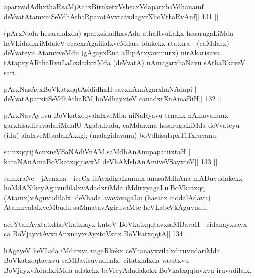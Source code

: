 \begin{shl}
aparxsidAdhxthaRsaMjAcnxBiruketxVshecxVdaparxboVdhanamf |
deVvatAtamxniSeVdhAthaRparatAvxtatxdagxrXhoV\s thaRvAnf\hfill || 131 ||
\end{shl}

\begin{artha}
(pArxNada hesaralalxda) aparxsidadhxvAda athaRvuLaLx hesarugaLiMda  heVLidadxriMdaleV ecacxrAgalilalxveMdare idakekx utatxra - (caMdarx) deVvateyu AtamxveMdu (gAgayxRna aBipArxyavanunx) nirAkarisuva tAtapxyARthaRvuLaLxdadxriMda (deVvatA) nAmagarxhaNavu sAthaRkaveV sari.
\end{artha}


\begin{shl}
pArxNasAyxBoVkatxqqtAsididhxH savxnAmAgarxhaNAdapi |
deVvatAparxtiSeVdhAthaRM boVdhayxteV  canadxrXnAmaBiH\hfill || 132 ||
\end{shl}

\begin{artha}
pArxNavAyuvu BoVkatxqqvalalxveMba niNaRyavu tananx nAmavanunx garxhisadiruvadariMdalU Agabahudu, caMdarxna hesarugaLiMda deVvateyu (idu) alalxveMbudakAkxgi; (malagidavanu) boVdhisalapxTiTxruvanu.
\end{artha}


\begin{shl}
samxqqtijAcnxneVSaNAdiVnAM saMdhAnAnupapatitxtaH |
karaNAnAmaBoVkatxqqtavxM deVhAMshAnAmiveVSayxteV\hfill || 133 ||
\end{shl}

\begin{artha}
samxraNe - jAcnxna - iceCx itAyxdigaLanunx anusaMdhAna mADuvudakekx hoMdANikeyAguvudilalxvAdadxriMda iMdirxyagaLu BoVkatxqq (Atamx)vAguvudilalx, deVhada avayavagaLu (hasatx modalAdavu) AtamxvalalxveMbudu saMmatavAgiruvaMte heVLabeVkAguvudu.
\end{artha}

\begin{shl}
aceYtanAyxtatxthoVkatxsayx kutoV BoVkatxqqtavxsaMBavaH |
cidanayxsayx ca BoVjayxtAvxnAnxnayxsAyxtoV\s sitx BoVkatxqqtA\hfill || 134 ||
\end{shl}

\begin{artha}
hAgeyeV heVLida iMdirxya vagaRkekx ceYtanayxvilalxdiruvudariMda  BoVkatxqqtavxvu saMBavisuvudilalx. citatxlalxda vasutxvu BoVjayxvAdadxriMda adakekx beVreyAdudakekx BoVkatxqqtavxvu iruvudilalx.
\end{artha}

